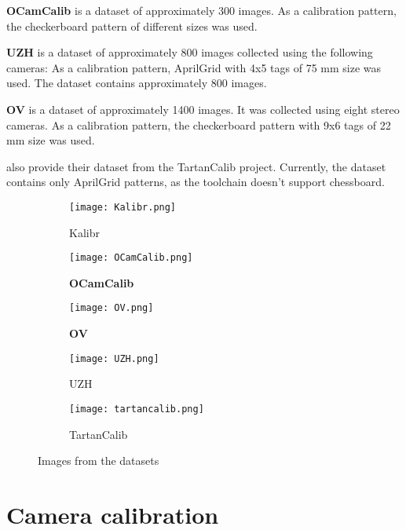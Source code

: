 \textbf{OCamCalib} \citep{scaramuzzaFlexibleTechniqueAccurate2006} is a dataset
of approximately 300 images.
As a calibration pattern, the checkerboard pattern of different sizes was used.

\textbf{UZH} \citep{AreWeReady} is a dataset of approximately 800 images
collected using the following cameras:
As a calibration pattern, AprilGrid with 4x5 tags of 75 mm size was used.
The dataset contains approximately 800 images.

\textbf{OV} \citep{lochmanBabelCalibUniversalApproach2021} is a dataset of
approximately 1400 images. It was collected using eight stereo cameras.
As a calibration pattern, the checkerboard pattern with 9x6 tags of 22 mm size
was used.

\textcite{duisterhofTartanCalibIterativeWideAngle2022} also provide their
dataset from the TartanCalib project. Currently, the dataset contains only
AprilGrid patterns, as the toolchain doesn't support chessboard.

\begin{figure}[h]
	\centering
	\begin{subfigure}[b]{0.3\linewidth}
		\texttt{[image: Kalibr.png]}
		\caption{Kalibr}
	\end{subfigure}
	\hfill
	\begin{subfigure}[b]{0.3\linewidth}
		\texttt{[image: OCamCalib.png]}
		\caption{\textbf{OCamCalib}}
	\end{subfigure}
	\hfill
	\begin{subfigure}[b]{0.3\linewidth}
		\texttt{[image: OV.png]}
		\caption{\textbf{OV}}
	\end{subfigure}
	\begin{subfigure}[b]{0.3\linewidth}
		\texttt{[image: UZH.png]}
		\caption{UZH}
	\end{subfigure}
	\begin{subfigure}[b]{0.3\linewidth}
		\texttt{[image: tartancalib.png]}
		\caption{TartanCalib}
	\end{subfigure}
	\caption{Images from the datasets}
\end{figure}

\section{Camera calibration}\label{sec:camera_calibration}

